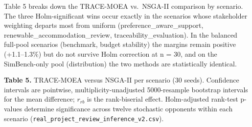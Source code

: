 \documentclass[
  10pt,
  a4paper,
]{article}
\begin{document}
Table 5 breaks down the TRACE-MOEA vs.~NSGA-II comparison by scenario.
The three Holm-significant wins occur exactly in the scenarios whose
stakeholder weighting departs most from uniform
(preference\_aware\_support, renewable\_accommodation\_review,
traceability\_evaluation). In the balanced full-pool scenarios
(benchmark, budget stability) the margins remain positive (+1.1--1.3\%)
but do not survive Holm correction at n = 30, and on the SimBench-only
pool (distribution) the two methods are statistically identical.

\textbf{Table 5.} TRACE-MOEA versus NSGA-II per scenario (30 seeds).
Confidence intervals are pointwise, multiplicity-unadjusted
5000-resample bootstrap intervals for the mean difference; \(r_{rb}\) is
the rank-biserial effect. Holm-adjusted rank-test p-values determine
significance across twelve stochastic opponents within each scenario
(\texttt{real\_project\_review\_inference\_v2.csv}).
\end{document}
